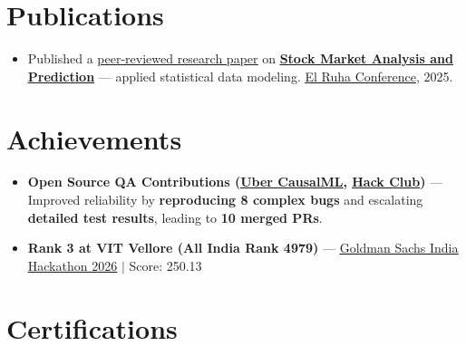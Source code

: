 \documentclass[a4paper,10pt]{article}
\newcommand{\ulink}[2]{\href{#1}{\uline{#2}}}
\begin{document}
\vspace{2pt}

\section{Publications}
\vspace{2pt}
\begin{itemize}[nosep, leftmargin=1.5em, itemsep=1pt, topsep=2pt]
  \item {\color[HTML]{0A0A0A}\fontsize{11}{14}\selectfont
  Published a \ulink{https://www.elruha.org/_files/ugd/614b1f_6b95e1b697bf452b9907ba46e0151c05.pdf\#page=774}{peer-reviewed research paper} on \ulink{https://github.com/su-jin1425/Set-Project}{\textbf{Stock Market Analysis and Prediction}} --- applied statistical data modeling. \ulink{https://www.elruha.org/congress-books}{El Ruha Conference}, 2025.}
\end{itemize}

\vspace{2pt}

\section{Achievements}
\vspace{2pt}
\begin{itemize}[nosep, leftmargin=1.5em, itemsep=1pt, topsep=2pt]
  \item {\color[HTML]{0A0A0A}\fontsize{11}{14}\selectfont \textbf{Open Source QA Contributions (\ulink{https://github.com/uber/causalml}{Uber CausalML}, \ulink{https://github.com/hackclub/stardance}{Hack Club})} --- Improved reliability by \textbf{reproducing 8 complex bugs} and escalating \textbf{detailed test results}, leading to \textbf{10 merged PRs}.}
  \item {\color[HTML]{0A0A0A}\fontsize{11}{14}\selectfont \textbf{Rank 3 at VIT Vellore (All India Rank 4979)} --- \ulink{https://www.hackerrank.com/contests/goldman-sachs-india-hackathon-2026-cs/leaderboard}{Goldman Sachs India Hackathon 2026} $|$ Score: 250.13}
\end{itemize}

\vspace{2pt}

\section{Certifications}
\vspace{2pt}
\end{document}
